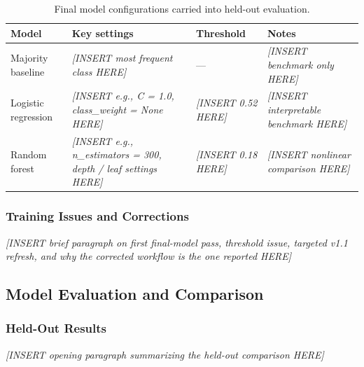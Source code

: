 \documentclass[12pt]{article}
\newcommand{\placeholder}[1]{\textit{[INSERT #1 HERE]}}
\begin{document}
\begin{table}[H]
\centering
\small
\caption{Final model configurations carried into held-out evaluation.}
\label{tab:model_configs}
\begin{tabular}{@{}L{3.2cm}L{3.8cm}L{2.3cm}L{3.8cm}@{}}
\toprule
\textbf{Model} & \textbf{Key settings} & \textbf{Threshold} & \textbf{Notes} \\
\midrule
Majority baseline & \placeholder{most frequent class} & --- & \placeholder{benchmark only} \\
Logistic regression & \placeholder{e.g., C = 1.0, class\_weight = None} & \placeholder{0.52} & \placeholder{interpretable benchmark} \\
Random forest & \placeholder{e.g., n\_estimators = 300, depth / leaf settings} & \placeholder{0.18} & \placeholder{nonlinear comparison} \\
\bottomrule
\end{tabular}
\end{table}

\subsubsection*{Training Issues and Corrections}
\placeholder{brief paragraph on first final-model pass, threshold issue, targeted v1.1 refresh, and why the corrected workflow is the one reported}

\subsection{Model Evaluation and Comparison}
\label{subsec:model_evaluation}

%
%

\subsubsection*{Held-Out Results}
\placeholder{opening paragraph summarizing the held-out comparison}
\end{document}
